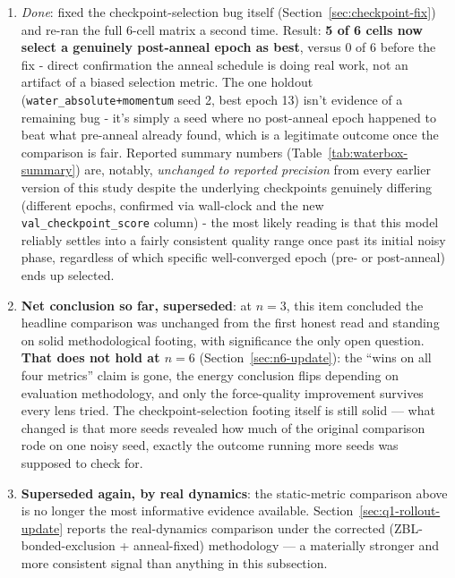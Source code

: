 \documentclass[11pt]{article}
\begin{document}
\begin{enumerate}
  windowed pre/post-anneal comparison (item 2 above, computed for real this
  time via \texttt{src/analyze\_anneal\_effect.py} rather than by hand) held
  up: 5 of 6 cells' median post-anneal energy error improved over pre-anneal,
  all 6 cells' median force error improved despite force's loss weight
  dropping from 0.95 to 0.25. But this retrain still used the \emph{old},
  biased \texttt{val\_total\_mse\_loss} monitor for actual checkpoint
  selection, so its reported best-checkpoint summary numbers were not yet
  trustworthy on their own terms.
  \item \emph{Done}: fixed the checkpoint-selection bug itself
  (Section~\ref{sec:checkpoint-fix}) and re-ran the full 6-cell matrix a
  second time. Result: \textbf{5 of 6 cells now select a genuinely
  post-anneal epoch as best}, versus 0 of 6 before the fix - direct
  confirmation the anneal schedule is doing real work, not an artifact of a
  biased selection metric. The one holdout
  (\texttt{water\_absolute+momentum} seed 2, best epoch 13) isn't evidence of
  a remaining bug - it's simply a seed where no post-anneal epoch happened to
  beat what pre-anneal already found, which is a legitimate outcome once the
  comparison is fair. Reported summary numbers (Table~\ref{tab:waterbox-summary})
  are, notably, \emph{unchanged to reported precision} from every earlier
  version of this study despite the underlying checkpoints genuinely
  differing (different epochs, confirmed via wall-clock and the new
  \texttt{val\_checkpoint\_score} column) - the most likely reading is that
  this model reliably settles into a fairly consistent quality range once
  past its initial noisy phase, regardless of which specific well-converged
  epoch (pre- or post-anneal) ends up selected.
  \item \textbf{Net conclusion so far, superseded}: at $n=3$, this item
  concluded the headline comparison was unchanged from the first honest
  read and standing on solid methodological footing, with significance the
  only open question. \textbf{That does not hold at $n=6$}
  (Section~\ref{sec:n6-update}): the ``wins on all four metrics'' claim is
  gone, the energy conclusion flips depending on evaluation methodology, and
  only the force-quality improvement survives every lens tried. The
  checkpoint-selection footing itself is still solid --- what changed is
  that more seeds revealed how much of the original comparison rode on one
  noisy seed, exactly the outcome running more seeds was supposed to check
  for.
  \item \textbf{Superseded again, by real dynamics}: the static-metric
  comparison above is no longer the most informative evidence available.
  Section~\ref{sec:q1-rollout-update} reports the real-dynamics comparison
  under the corrected (ZBL-bonded-exclusion + anneal-fixed) methodology ---
  a materially stronger and more consistent signal than anything in this
  subsection.
\end{enumerate}
\end{document}

